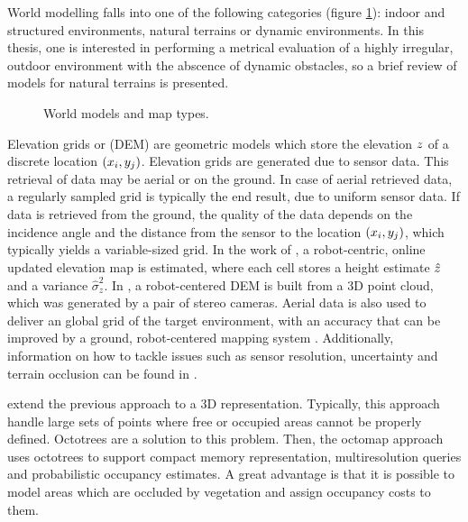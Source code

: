 World modelling falls into one of the following categories (figure \ref{fig:worldsMaps}): indoor and structured environments, natural terrains or dynamic environments. In this thesis, one is interested in performing a metrical evaluation of a highly irregular, outdoor environment with the abscence of dynamic obstacles, so a brief review of models for natural terrains is presented.

\begin{figure}[h]
\centering
{}
\caption{World models and map types.}
\label{fig:worldsMaps}
\end{figure}

Elevation grids or  (DEM) are geometric models which store the elevation $z$ of a discrete location $(x_i, y_j)$. Elevation grids are generated due to sensor data. This retrieval of data may be aerial or on the ground. In case of aerial retrieved data, a regularly sampled grid is typically the end result, due to uniform sensor data. If data is retrieved from the ground, the quality of the data depends on the incidence angle and the distance from the sensor to the location $(x_i, y_j)$, which typically yields a variable-sized grid. In the work of \citet{fankhauser2014robot}, a robot-centric, online updated elevation map is estimated, where each cell stores a height estimate $\hat{z}$ and a variance $\hat{\sigma}_z^2$. In \cite{Correal2011}, a robot-centered DEM is built from a 3D point cloud, which was generated by a pair of stereo cameras. Aerial data \cite{Smith2001} is also used to deliver an  global grid of the target environment, with an accuracy that can be improved by a ground, robot-centered mapping system \cite{Jayasekara2012, Correal2011}.  Additionally, information on how to tackle issues such as sensor resolution, uncertainty and terrain occlusion can be found in \cite{chapter45handbookrobotics}.

 extend the previous approach to a 3D representation. Typically, this approach handle large sets of points where free or occupied areas cannot be properly defined. Octotrees are a solution to this problem. Then, the octomap approach \cite{Jayasekara2012} uses octotrees to support compact memory representation, multiresolution queries and probabilistic occupancy estimates. A great advantage is that it is possible to model areas which are occluded by vegetation and assign occupancy costs to them.

